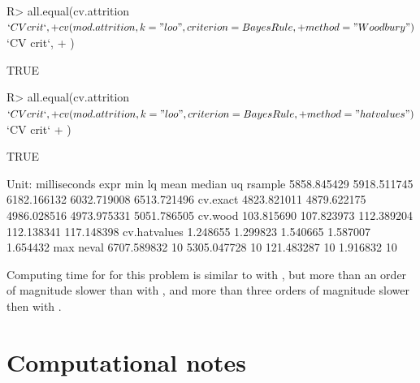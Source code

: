 \documentclass[
]{jss}
\begin{document}
\begin{CodeChunk}
\begin{CodeInput}
R> all.equal(cv.attrition$`CV crit`,
+           cv(mod.attrition, k="loo", criterion=BayesRule,
+              method="Woodbury")$`CV crit`,
+           )
\end{CodeInput}
\begin{CodeOutput}
[1] TRUE
\end{CodeOutput}
\begin{CodeInput}
R> all.equal(cv.attrition$`CV crit`,
+           cv(mod.attrition, k="loo", criterion=BayesRule,
+              method="hatvalues")$`CV crit`
+           )
\end{CodeInput}
\begin{CodeOutput}
[1] TRUE
\end{CodeOutput}
\begin{CodeOutput}
Unit: milliseconds
         expr         min          lq        mean      median          uq
      rsample 5858.845429 5918.511745 6182.166132 6032.719008 6513.721496
     cv.exact 4823.821011 4879.622175 4986.028516 4973.975331 5051.786505
      cv.wood  103.815690  107.823973  112.389204  112.138341  117.148398
 cv.hatvalues    1.248655    1.299823    1.540665    1.587007    1.654432
         max neval
 6707.589832    10
 5305.047728    10
  121.483287    10
    1.916832    10
\end{CodeOutput}
\end{CodeChunk}

Computing time for  for this problem is similar to
 with , but more than an order of
magnitude slower than  with , and
more than three orders of magnitude slower then  with
.

\section{Computational notes}\label{computational-notes}
\end{document}
